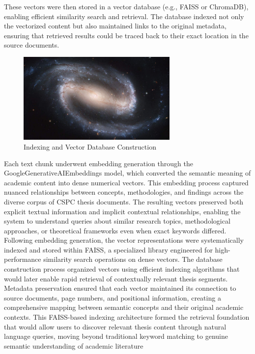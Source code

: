 \begin{refsection}
These vectors were then stored in a vector database (e.g., FAISS or ChromaDB), enabling efficient similarity search and retrieval. The database indexed not only the vectorized content but also maintained links to the original metadata, ensuring that retrieved results could be traced back to their exact location in the source documents.

\begin{figure}[h]
    \centering
    \includegraphics[width=0.7\textwidth]{figures/sampleFig1.jpg}
    \caption{Indexing and Vector Database Construction}
\end{figure}

Each text chunk underwent embedding generation through the GoogleGenerativeAIEmbeddings model, which converted the semantic meaning of academic content into dense numerical vectors. This embedding process captured nuanced relationships between concepts, methodologies, and findings across the diverse corpus of CSPC thesis documents. The resulting vectors preserved both explicit textual information and implicit contextual relationships, enabling the system to understand queries about similar research topics, methodological approaches, or theoretical frameworks even when exact keywords differed. Following embedding generation, the vector representations were systematically indexed and stored within FAISS, a specialized library engineered for high-performance similarity search operations on dense vectors. The database construction process organized vectors using efficient indexing algorithms that would later enable rapid retrieval of contextually relevant thesis segments. Metadata preservation ensured that each vector maintained its connection to source documents, page numbers, and positional information, creating a comprehensive mapping between semantic concepts and their original academic contexts. This FAISS-based indexing architecture formed the retrieval foundation that would allow users to discover relevant thesis content through natural language queries, moving beyond traditional keyword matching to genuine semantic understanding of academic literature



\end{refsection}
